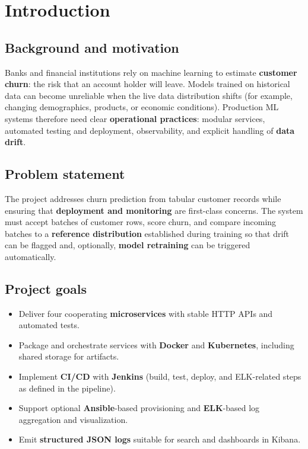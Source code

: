 \documentclass[11pt,a4paper,oneside]{report}
\begin{document}
\tableofcontents
\clearpage
{}

\chapter{Introduction}

\section{Background and motivation}
Banks and financial institutions rely on machine learning to estimate \textbf{customer churn}: the risk that an account holder will leave. Models trained on historical data can become unreliable when the live data distribution shifts (for example, changing demographics, products, or economic conditions). Production ML systems therefore need clear \textbf{operational practices}: modular services, automated testing and deployment, observability, and explicit handling of \textbf{data drift}.

\section{Problem statement}
The project addresses churn prediction from tabular customer records while ensuring that \textbf{deployment and monitoring} are first-class concerns. The system must accept batches of customer rows, score churn, and compare incoming batches to a \textbf{reference distribution} established during training so that drift can be flagged and, optionally, \textbf{model retraining} can be triggered automatically.

\section{Project goals}
\begin{itemize}[leftmargin=*]
  \item Deliver four cooperating \textbf{microservices} with stable HTTP APIs and automated tests.
  \item Package and orchestrate services with \textbf{Docker} and \textbf{Kubernetes}, including shared storage for artifacts.
  \item Implement \textbf{CI/CD} with \textbf{Jenkins} (build, test, deploy, and ELK-related steps as defined in the pipeline).
  \item Support optional \textbf{Ansible}-based provisioning and \textbf{ELK}-based log aggregation and visualization.
  \item Emit \textbf{structured JSON logs} suitable for search and dashboards in Kibana.
\end{itemize}
\end{document}
